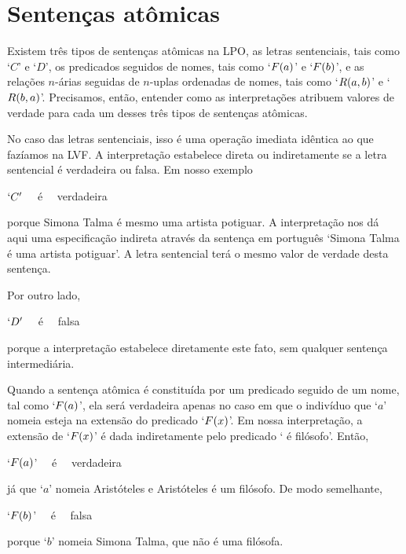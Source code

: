 \section{Sentenças atômicas}
Existem três tipos de sentenças atômicas na LPO, as letras sentenciais, tais como `$C$' e `$D$', os predicados seguidos de nomes, tais como  `$\mathord{F}(a)$' e `$\mathord{F}(b)$', e as relações $n$-árias seguidas de $n$-uplas ordenadas de nomes, tais como `$\mathord{R}(a,b)$' e `$\mathord{R}(b,a)$'.
Precisamos, então, entender como as interpretações atribuem valores de verdade para cada um desses três tipos de sentenças atômicas.

No caso das letras sentenciais, isso é uma operação imediata idêntica ao que fazíamos na LVF.
A interpretação estabelece direta ou indiretamente se a letra sentencial é verdadeira ou falsa.
Em nosso exemplo
\begin{center}
	$`C'$ \ \ é \ \ verdadeira   
\end{center}
porque Simona Talma é mesmo uma artista potiguar.
A interpretação nos dá aqui uma especificação indireta através da sentença em português `Simona Talma é uma artista potiguar'.
A letra sentencial terá o mesmo valor de verdade desta sentença.

Por outro lado,
\begin{center}
	$`D'$ \ \ é \ \ falsa   
\end{center}
porque a interpretação estabelece diretamente este fato, sem qualquer sentença intermediária.

Quando a sentença atômica é constituída por um predicado seguido de um nome, tal como `$\mathord{F}(a)$', ela será verdadeira apenas no caso em que o indivíduo que `$a$' nomeia esteja na extensão do predicado `$\mathord{F}(x)$'.
Em nossa interpretação, a extensão de `$\mathord{F}(x)$' é dada indiretamente pelo predicado ` é filósofo'.
Então,
\begin{center}
	`$\mathord{F}(a)$' \ \ é \ \ verdadeira
\end{center}
já que `$a$' nomeia Aristóteles e Aristóteles é um filósofo.
De modo semelhante,
\begin{center}
	`$\mathord{F}(b)$' \ \ é \ \ falsa
\end{center}
porque `$b$' nomeia Simona Talma, que não é uma filósofa.

